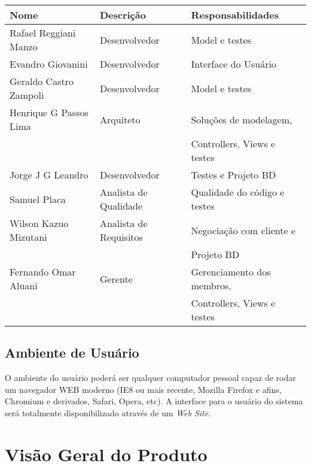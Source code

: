 \documentclass[11pt, a4paper]{article}
\begin{document}
           \begin{tabular}{| l | l | l|}
                \hline
                Nome &                      Descrição &              Responsabilidades \\ \hline
                Rafael Reggiani Manzo &     Desenvolvedor &          Model e testes\\  \hline
                Evandro Giovanini &         Desenvolvedor &          Interface do Usuário\\ \hline
                Geraldo Castro Zampoli  &   Desenvolvedor &          Model e testes\\ \hline
                Henrique G Passos Lima &    Arquiteto &              Soluções de modelagem,\\
                                        &                       &    Controllers, Views e testes\\ \hline
                Jorge J G Leandro  &        Desenvolvedor &          Testes e Projeto BD \\  \hline
                Samuel Placa &              Analista de Qualidade &  Qualidade do código e testes \\ \hline
                Wilson Kazuo Mizutani  &    Analista de Requisitos & Negociação com cliente  e\\
                                   &                            &    Projeto BD\\ \hline
                Fernando Omar Aluani   &    Gerente &                Gerenciamento dos membros, \\
                                   &                            &    Controllers, Views e testes\\ \hline
                \hline
          \end{tabular}
         
  \subsection{Ambiente de Usuário}

    O ambiente do usuário poderá ser qualquer computador pessoal capaz de rodar um navegador WEB
    moderno (IE8 ou mais recente, Mozilla Firefox e afins, Chromium e derivados, Safari, Opera,
    etc). A interface para o usuário do sistema será totalmente disponibilizado através de um
    \textit{Web Site}.
    
    \section{Visão Geral do Produto}
\end{document}
